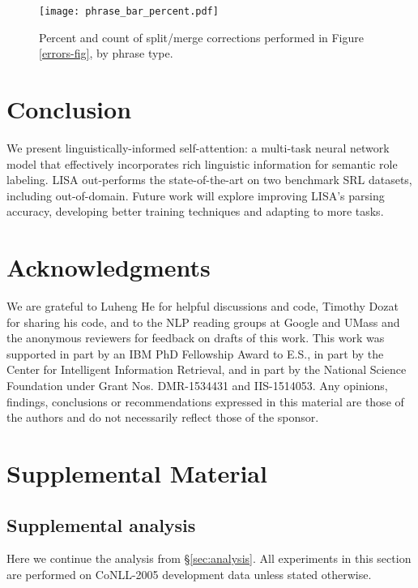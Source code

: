\documentclass[11pt,a4paper]{article}
\begin{document}
\begin{figure}
\centering
\texttt{[image: phrase\_bar\_percent.pdf]}
\caption{Percent and count of split/merge corrections performed in Figure \ref{errors-fig}, by phrase type. \label{fig:phrase-bar}}
\end{figure}

\section{Conclusion}
We present linguistically-informed self-attention: a multi-task neural network model that effectively incorporates rich linguistic information for semantic role labeling. LISA out-performs the state-of-the-art on two benchmark SRL datasets, including out-of-domain. Future work will explore improving LISA's parsing accuracy, developing better training techniques and adapting to more tasks.


\section*{Acknowledgments}
We are grateful to Luheng He for helpful discussions and code, Timothy Dozat for sharing his code, and to the NLP reading groups at Google and UMass and the anonymous reviewers for feedback on drafts of this work. This work was supported in part by an IBM PhD Fellowship Award to E.S., in part by the Center for Intelligent Information Retrieval, and in part by the National Science Foundation under Grant Nos. DMR-1534431 and IIS-1514053. Any opinions, findings, conclusions or recommendations expressed in this material are those of the authors and do not necessarily reflect those of the sponsor.




\clearpage\newpage
\appendix
\section{Supplemental Material \label{sec:supplemental}}


\subsection{Supplemental analysis \label{app:analysis}}
Here we continue the analysis from \S\ref{sec:analysis}. All experiments in this section are performed on CoNLL-2005 development data unless stated otherwise.
\end{document}
